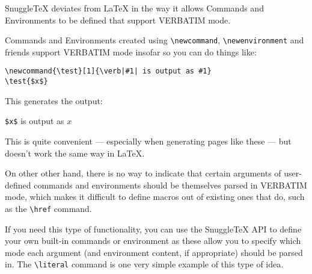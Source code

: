 SnuggleTeX deviates from LaTeX in the way it allows Commands
and Environments to be defined that support VERBATIM mode.

Commands and Environments created using \verb|\newcommand|,
\verb|\newenvironment| and friends support VERBATIM mode insofar
so you can do things like:

\begin{verbatim}
\newcommand{\test}[1]{\verb|#1| is output as #1}
\test{$x$}
\end{verbatim}

This generates the output:

\newcommand{\test}[1]{\verb|#1| is output as #1}
\test{$x$}

This is quite convenient --- especially when generating pages like these ---
but doesn't work the same way in LaTeX.

On other other hand, there is no way to indicate that certain arguments
of user-defined commands and environments should be themselves parsed in
VERBATIM mode, which makes it difficult to define macros out of existing
ones that do, such as the \verb|\href| command.

If you need this type of functionality, you can use the SnuggleTeX API to
define your own built-in commands or environment as these allow you to specify
which mode each argument (and environment content, if appropriate) should be
parsed in. The \verb|\literal| command is one very simple example of this
type of idea.
